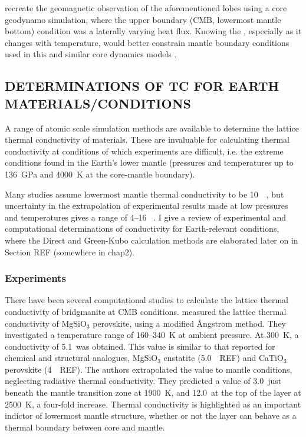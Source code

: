 \citet{Gubbins2007} recreate the geomagnetic observation of the aforementioned lobes using a core geodynamo simulation, where the upper boundary (CMB, lowermost mantle bottom) condition was a laterally varying heat flux. Knowing the \tc, especially as it changes with temperature, would better constrain mantle boundary conditions used in this and similar core dynamics models \citep{Ammann2014}.



\subsection{DETERMINATIONS OF TC FOR EARTH MATERIALS/CONDITIONS}

A range of atomic scale simulation methods are available to determine the lattice thermal conductivity of materials. These are invaluable for calculating thermal conductivity at conditions of which experiments are difficult, i.e. the extreme conditions found in the Earth's lower mantle (pressures and temperatures up to 136~GPa and 4000~K at the core-mantle boundary). 

Many studies assume lowermost mantle thermal conductivity to be 10~\wmk\ \citep[e.g.][]{Lay2008}, but uncertainty in the extrapolation of experimental results made at low pressures and temperatures gives a range of 4--16 \wmk~\citep{Brown1986, Osako1991, Hofmeister1999, Goncharov2009, Manthilake2011, Ohta2012}. I give a review of experimental and computational determinations of conductivity for Earth-relevant conditions, where the Direct and Green-Kubo calculation methods are elaborated later on in Section REF (somewhere in chap2).

\subsubsection{Experiments}

There have been several computational studies to calculate the lattice thermal conductivity of bridgmanite at CMB conditions. \citet{Osako1991} measured the lattice thermal conductivity of MgSiO$_3$ perovskite, using a modified \AA ngstrom method. They investigated a temperature range of 160--340~K at ambient pressure. At 300~K, a conductivity of 5.1~\wmks was obtained. This value is similar to that reported for chemical and structural analogues, MgSiO$_3$ enstatite (5.0~\wmk~REF) and CaTiO$_{3}$ perovskite (4~\wmk~REF). The authors extrapolated the value to mantle conditions, neglecting radiative thermal conductivity. They predicted a value of 3.0~\wmks just beneath the mantle transition zone at 1900~K, and 12.0~\wmks at the top of the \ddds layer at 2500~K, a four-fold increase. Thermal conductivity is highlighted as an important indictor of lowermost mantle structure, whether or not the \ddds layer can behave as a thermal boundary between core and mantle.


